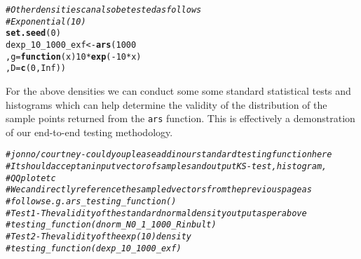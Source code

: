 \documentclass{article}\usepackage[]{graphicx}\usepackage[]{color}
\makeatletter
\newcommand{\hlnum}[1]{\textcolor[rgb]{0.686,0.059,0.569}{#1}}%
\newcommand{\hlcom}[1]{\textcolor[rgb]{0.678,0.584,0.686}{\textit{#1}}}%
\newcommand{\hlopt}[1]{\textcolor[rgb]{0,0,0}{#1}}%
\newcommand{\hlstd}[1]{\textcolor[rgb]{0.345,0.345,0.345}{#1}}%
\newcommand{\hlkwa}[1]{\textcolor[rgb]{0.161,0.373,0.58}{\textbf{#1}}}%
\newcommand{\hlkwb}[1]{\textcolor[rgb]{0.69,0.353,0.396}{#1}}%
\newcommand{\hlkwc}[1]{\textcolor[rgb]{0.333,0.667,0.333}{#1}}%
\newcommand{\hlkwd}[1]{\textcolor[rgb]{0.737,0.353,0.396}{\textbf{#1}}}%
\newenvironment{kframe}{%
 \def\at@end@of@kframe{}%
 \ifinner\ifhmode%
  \def\at@end@of@kframe{\end{minipage}}%
  \begin{minipage}{\columnwidth}%
 \fi\fi%
 \def\FrameCommand##1{\hskip\@totalleftmargin \hskip-\fboxsep
 \colorbox{shadecolor}{##1}\hskip-\fboxsep
     \hskip-\linewidth \hskip-\@totalleftmargin \hskip\columnwidth}%
 \MakeFramed {\advance\hsize-\width
   \@totalleftmargin\z@ \linewidth\hsize
   \@setminipage}}%
 {\par\unskip\endMakeFramed%
 \at@end@of@kframe}
\newenvironment{knitrout}{}{} %
\makeatother
\begin{document}
\begin{knitrout}
\begin{kframe}
\begin{alltt}
 \hlcom{# Other densities can also be tested as follows}
 \hlcom{# Exponential(10)}
 \hlkwd{set.seed}\hlstd{(}\hlnum{0}\hlstd{)}
 \hlstd{dexp_10_1000_exf} \hlkwb{<-} \hlkwd{ars}\hlstd{(}\hlnum{1000}
                         \hlstd{,} \hlkwc{g} \hlstd{=} \hlkwa{function}\hlstd{(}\hlkwc{x}\hlstd{)} \hlnum{10}\hlopt{*}\hlkwd{exp}\hlstd{(}\hlopt{-}\hlnum{10}\hlopt{*}\hlstd{x)}
                         \hlstd{,} \hlkwc{D}\hlstd{=}\hlkwd{c}\hlstd{(}\hlnum{0}\hlstd{,} \hlnum{Inf}\hlstd{))}
\end{alltt}
\end{kframe}
\end{knitrout}

For the above densities we can conduct some some standard statistical tests and 
histograms which can help determine the validity of the distribution of the sample 
points returned from the \texttt{ars} function. This is effectively a demonstration of 
our end-to-end testing methodology.

\begin{knitrout}
\color{fgcolor}\begin{kframe}
\begin{alltt}
 \hlcom{# jonno/ courtney - could you please add in our standard testing function here}
 \hlcom{# It should accept an input vector of samples and output KS-test, histogram, }
 \hlcom{# QQplot etc}
 \hlcom{# We can directly reference the sampled vectors from the previous page as }
 \hlcom{# follows e.g. ars_testing_function()}
 \hlcom{# Test 1 - The validity of the standard normal density output as per above}
 \hlcom{# testing_function(dnorm_N0_1_1000_Rinbult)}
 \hlcom{# Test 2 - The validity of the exp(10) density}
 \hlcom{# testing_function(dexp_10_1000_exf)}
\end{alltt}
\end{kframe}
\end{knitrout}



\end{document}
